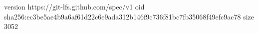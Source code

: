 version https://git-lfs.github.com/spec/v1
oid sha256:ec3be5ae4b9a6af61d22c6e9ada312b146f9c736f81bc7fb35068f49efc9ac78
size 3052
